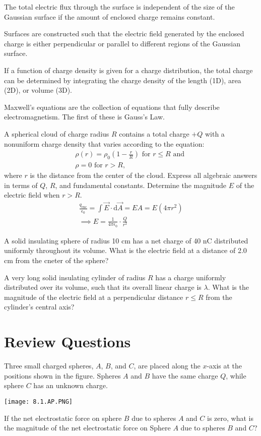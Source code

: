 \documentclass[../em.tex]{subfiles}
\begin{document}
The total electric flux through the surface is independent of the size of the Gaussian 
surface if the amount of enclosed charge remains constant.

Surfaces are constructed such that the electric field generated by the enclosed 
charge is either perpendicular or parallel to different regions of the Gaussian surface.

If a function of charge density is given for a charge distribution, the total 
charge can be determined by integrating the charge density of the length (1D), area (2D), or volume (3D).

Maxwell's equations are the collection of equations that fully describe electromagnetism. The first of these is Gauss's Law.
\begin{example}
    A spherical cloud of charge radius $R$ contains a total charge $+Q$ with a 
    nonuniform charge density that varies according to the equation:
    \begin{align*}
        \rho(r)=\rho_0\left(1-\frac{r}{R}\right) \text{ for } r\leq R \text{ and }\\
        \rho = 0 \text{ for } r>R\text{,}
    \end{align*}
    where $r$ is the distance from the center of the cloud. Express all algebraic answers in terms of $Q$, $R$, and fundamental constants. Determine the magnitude $E$ of the electric field when $r>R$.
    \begin{align*}
        \frac{q_\text{enc}}{\epsilon_0}=\int\vec{E}\cdot\mathrm{d}\vec{A}=EA=E(4\pi r^2)
        \\
        \implies E=\frac{1}{4\pi\epsilon_0}\cdot\frac{Q}{r^2}
    \end{align*}
\end{example}
\ex A solid insulating sphere of radius 10 cm has a net charge of 40 nC distributed uniformly throughout its volume. What is the electric field at a distance of 2.0 cm from the cneter of the sphere?

\ex A very long solid insulating cylinder of radius $R$ has a charge uniformly distributed over its volume, such that its overall linear charge is $\lambda$. What is the magnitude of the electric field at a perpendicular distance $r\leq R$ from the cylinder's central axis?

\section*{Review Questions}
\ex Three small charged spheres, $A$, $B$, and $C$, are placed along the $x$-axis at the positions shown in the figure. Spheres $A$ and $B$ have the same charge $Q$, while sphere $C$ has an unknown charge. 
\begin{center}
    \texttt{[image: 8.1.AP.PNG]}
\end{center}
If the net electrostatic force on sphere $B$ due to spheres $A$ and $C$ is zero, what is the magnitude of the net electrostatic force on Sphere $A$ due to spheres $B$ and $C$?
\end{document}
